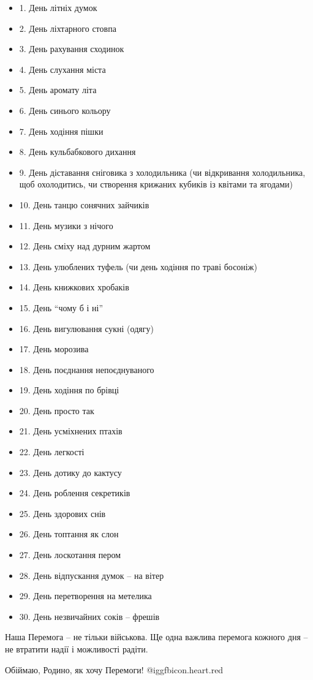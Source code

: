 \begin{itemize}
  \item 1. День літніх думок
  \item 2. День ліхтарного стовпа
  \item 3. День рахування сходинок
  \item 4. День слухання міста
  \item 5. День аромату літа
  \item 6. День синього кольору
  \item 7. День ходіння пішки
  \item 8. День кульбабкового дихання
  \item 9. День діставання сніговика з холодильника (чи відкривання холодильника, щоб охолодитись, чи створення крижаних кубиків із квітами та ягодами)
  \item 10. День танцю сонячних зайчиків
  \item 11. День музики з нічого
  \item 12. День сміху над дурним жартом
  \item 13. День улюблених туфель (чи день ходіння по траві босоніж)
  \item 14. День книжкових хробаків
  \item 15. День \enquote{чому б і ні}
  \item 16. День вигулювання сукні (одягу)
  \item 17. День морозива
  \item 18. День поєднання непоєднуваного
  \item 19. День ходіння по брівці
  \item 20. День просто так
  \item 21. День усміхнених птахів
  \item 22. День легкості
  \item 23. День дотику до кактусу
  \item 24. День роблення секретиків
  \item 25. День здорових снів
  \item 26. День топтання як слон
  \item 27. День лоскотання пером
  \item 28. День відпускання думок – на вітер
  \item 29. День перетворення на метелика
  \item 30. День незвичайних соків – фрешів
\end{itemize}

Наша Перемога – не тільки військова. Ще одна важлива перемога кожного дня – не
втратити надії і можливості радіти. 

Обіймаю, Родино, як хочу Перемоги! @igg{fbicon.heart.red}

